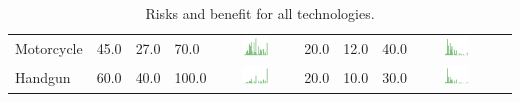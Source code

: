 \begin{table}[t]
\begin{center}
\begin{tabular}{| p{2cm} | p{1cm} | p{1cm} | p{1cm} | c | p{2cm} | p{1cm} | p{1cm} | p{1cm} | c |}
Motorcycle & 45.0 & 27.0 & 70.0 & \includegraphics[width = 2cm, height = 0.5cm]{tables/MotorcycleRisk}  & 20.0 & 12.0 & 40.0 & \includegraphics[width = 2cm, height = 0.5cm]{tables/MotorcycleBenefit} \\ 
Handgun & 60.0 & 40.0 & 100.0 & \includegraphics[width = 2cm, height = 0.5cm]{tables/HandgunRisk} & 20.0 & 10.0 & 30.0 & \includegraphics[width = 2cm, height = 0.5cm]{tables/HandgunBenefit} \\ 


\hline
\end{tabular}
\caption{Risks and benefit for all technologies.}
\label{allriskben}
\end{center}
\end{table}
